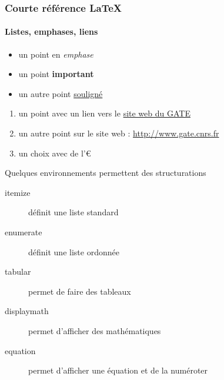 
\begin{frame}
  \frametitle{Courte référence \LaTeX{}}
  \framesubtitle{Listes, emphases, liens}

  
  \begin{itemize}
  \item un point en \emph{emphase}
  \item un point \textbf{important}
  \item un autre point \underline{souligné}
  \end{itemize} 
  
  \pause  
  
  
  \begin{enumerate}
  \item un point avec un lien vers le \href{http://www.gate.cnrs.fr}{site web du GATE}
  \item un autre point sur le site web : \url{http://www.gate.cnrs.fr}
  \item un choix avec de l'€
  \end{enumerate}

  \pause


  Quelques environnements permettent des structurations 

  \begin{description}
  \item[itemize] définit une liste standard
  \item[enumerate] définit une liste ordonnée
  \item[tabular] permet de faire des tableaux
  \item[displaymath] permet d'afficher des mathématiques
  \item[equation] permet d'afficher une équation et de la numéroter
  \end{description}
\end{frame}


